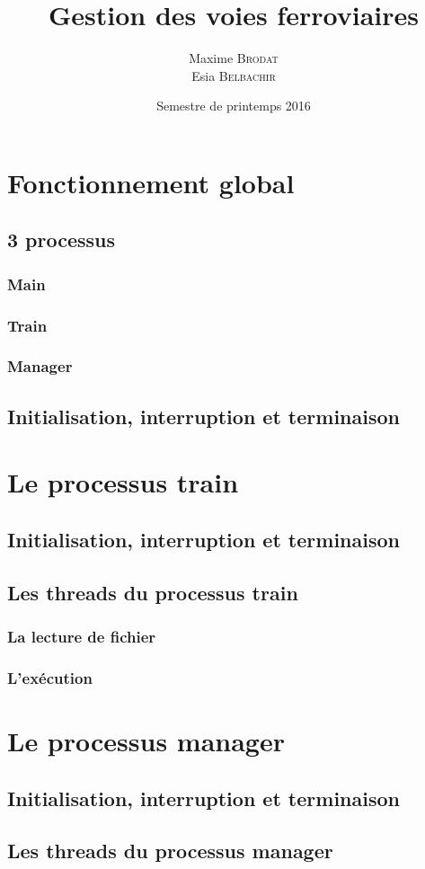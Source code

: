 \documentclass[a4paper,12pt]{article}
\title{Gestion des voies ferroviaires}{Projet de LO41}
\author{Maxime \textsc{Brodat} \\ Esia \textsc{Belbachir}}
\date{Semestre de printemps 2016}
\begin{document}
\maketitlepage

\tableofcontents
\pagebreak

\neverindent

\section{Fonctionnement global}

\subsection{3 processus}

\subsubsection{Main}

\subsubsection{Train}

\subsubsection{Manager}

\subsection{Initialisation, interruption et terminaison}

\section{Le processus train}

\subsection{Initialisation, interruption et terminaison}

\subsection{Les threads du processus train}

\subsubsection{La lecture de fichier}

\subsubsection{L'exécution}

\section{Le processus manager}

\subsection{Initialisation, interruption et terminaison}

\subsection{Les threads du processus manager}
\end{document}
